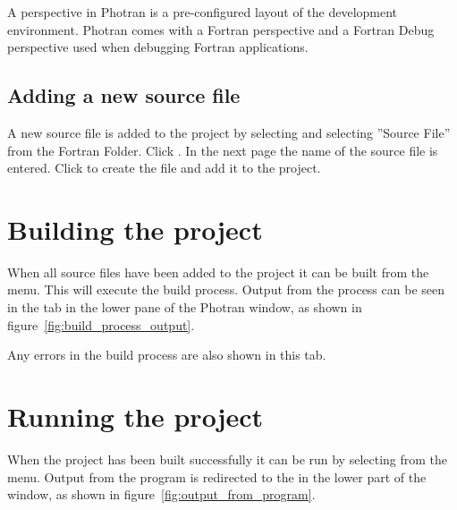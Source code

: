 
\noindent A perspective in Photran is a pre-configured layout of the development environment. Photran comes with a Fortran perspective and a Fortran Debug perspective used when debugging Fortran applications.

\subsection{Adding a new source file}

A new source file is added to the project by selecting  and selecting ''Source File'' from the Fortran Folder. Click . In the next page the name of the source file is entered. Click  to create the file and add it to the project.

\section{Building the project}

When all source files have been added to the project it can be built from the  menu. This will execute the build process. Output from the process can be seen in the  tab in the lower pane of the Photran window, as shown in figure~\ref{fig:build_process_output}.


Any errors in the build process are also shown in this tab.

\section{Running the project}

When the project has been built successfully it can be run by selecting  from the menu. Output from the program is redirected to the  in the lower part of the window, as shown in figure~\ref{fig:output_from_program}.




